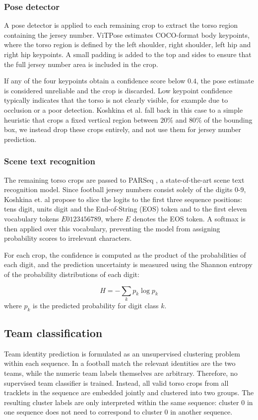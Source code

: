 \subsubsection{Pose detector}
A pose detector is applied to each remaining crop to extract the torso region containing the jersey number. ViTPose \cite{vitpose} estimates COCO-format body keypoints, where the torso region is defined by the left shoulder, right shoulder, left hip and right hip keypoints. A small padding is added to the top and sides to ensure that the full jersey number area is included in the crop.

If any of the four keypoints obtain a confidence score below $0.4$, the pose estimate is considered unreliable and the crop is discarded. Low keypoint confidence typically indicates that the torso is not clearly visible, for example due to occlusion or a poor detection. Koshkina et al. fall back in this case to a simple heuristic that crops a fixed vertical region between $20\%$ and $80\%$ of the bounding box, we instead drop these crops entirely, and not use them for jersey number prediction.


\subsubsection{Scene text recognition}
The remaining torso crops are passed to PARSeq \cite{parseq}, a state-of-the-art scene text recognition model. Since football jersey numbers consist solely of the digits 0-9, Koshkina et. al propose to slice the logits to the first three sequence positions: tens digit, units digit and the End-of-String (EOS) token and to the first eleven vocabulary tokens $E0123456789$, where $E$ denotes the EOS token. A softmax is then applied over this vocabulary, preventing the model from assigning probability scores to irrelevant characters.

For each crop, the confidence is computed as the product of the probabilities of each digit, and the prediction uncertainty is measured using the Shannon entropy of the probability distributions of each digit:

\[
H = - \sum_{k} p_k\log p_k
\]
where $p_k$ is the predicted probability for digit class $k$. 


\subsection{Team classification}
Team identity prediction is formulated as an unsupervised clustering problem within each sequence. In a football match the relevant identities are the two teams, while the numeric team labels themselves are arbitrary. Therefore, no supervised team classifier is trained. Instead, all valid torso crops from all tracklets in the sequence are embedded jointly and clustered into two groups. The resulting cluster labels are only interpreted within the same sequence: cluster 0 in one sequence does not need to correspond to cluster 0 in another sequence.

